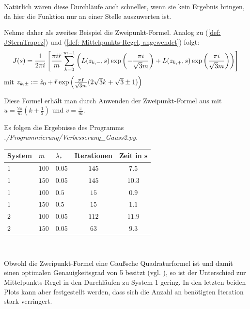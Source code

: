 \documentclass[a4paper,12pt]{report}
\newcommand{\zitat}[1]{\glqq #1\grqq}
\newcommand{\klammer}[1]{\left(#1\right)}
\newcommand{\1}{\mathds{1}}
\theoremstyle{plain} %
\theoremstyle{definition} %
\theoremstyle{remark}
\begin{document}
            Natürlich wären diese Durchläufe auch schneller, wenn sie kein Ergebnis bringen, da hier die Funktion nur an einer Stelle auszuwerten ist.

            Nehme daher als zweites Beispiel die \zitat{Zweipunkt-Formel}\cite[S. 526]{numerikHermann}. Analog zu (\ref{def: JSternTrapez}) und (\ref{def: Mittelpunkts-Regel, angewendet}) folgt:
            \begin{align}
                  J(s) = \frac 1 {2\pi i}\left[\frac{\pi i \Tilde r}{m}\sum_{k=0}^{m-1}\klammer{L(z_{k,-}, s)\exp\klammer{-\frac{\pi i}{\sqrt{3}m}}+L(z_{k,+}, s)\exp\klammer{\frac{\pi i}{\sqrt{3}m}}}\right]
            \end{align}
            mit $z_{k,\pm}:=\Tilde z_0+\Tilde r\exp\klammer{\frac{\pi I}{\sqrt{3}m}(2\sqrt 3 k+\sqrt 3 \pm 1)}$

            Diese Formel erhält man durch Anwenden der Zweipunkt-Formel aus \cite[S. 526]{numerikHermann} mit $u= \frac{2\pi}{m}(k+\frac 1 2)$ und $v=\frac \pi m$.

            Es folgen die Ergebnisse des Programms \textit{./Programmierung/Verbesserung\_Gauss2.py}.

            \begin{table}[!ht]
                  \centering
                  \begin{tabular}{lllcc}
                       System & $m$ & $\lambda_*$ & Iterationen & Zeit in s\\
                       \hline
                       1 & $100$ & $0.05$ & $145$ & $7.5$ \\ 
                       1 & $150$ & $0.05$ & $145$ & $10.3$ \\
                       \hline
                       1 & $100$ & $0.5$ & $15$ & $0.9$ \\
                       1 & $150$ & $0.5$ & $15$ & $1.1$ \\
                       \hline
                       2 & $100$ & $0.05$ & $112$ & $11.9$ \\
                       2 & $150$ & $0.05$ & $63$ & $9.3$ \\
                       \hline
                  \end{tabular}\\
                  \label{tab: Ergebnisse_Gauss2}
            \end{table}

            Obwohl die Zweipunkt-Formel eine \zitat{Gaußsche Quadraturformel}\cite[S. 523]{numerikHermann} ist
            und damit einen optimalen Genauigkeitsgrad von 5 besitzt (vgl. \cite[S. 522f.]{numerikHermann}),
            so ist der Unterschied zur Mittelpunkts-Regel in den Durchläufen zu System 1 gering.
            In den letzten beiden Plots kann aber festgestellt werden, dass sich die Anzahl an benötigten Iteration stark verringert.
\end{document}
